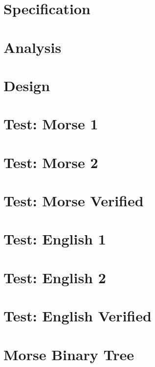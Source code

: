 \documentclass[twoside]{article}
\newcommand{\+}{\discretionary{\mbox{\scriptsize$\hookleftarrow$}}{}{}}
\begin{document}
\section{Specification}
\label{Specification}
\hypertarget{Specification}{}

\section{Analysis}
\label{Analysis}
\hypertarget{Analysis}{}

\section{Design}
\label{Design}
\hypertarget{Design}{}

\section{Test\+: Morse 1}
\label{Test_1_01Morse_011}
\hypertarget{Test_1_01Morse_011}{}

\section{Test\+: Morse 2}
\label{Test_1_01Morse_012}
\hypertarget{Test_1_01Morse_012}{}

\section{Test\+: Morse Verified}
\label{Test_1_01Morse_01Verified}
\hypertarget{Test_1_01Morse_01Verified}{}

\section{Test\+: English 1}
\label{Test_1_01English_011}
\hypertarget{Test_1_01English_011}{}

\section{Test\+: English 2}
\label{Test_1_01English_012}
\hypertarget{Test_1_01English_012}{}

\section{Test\+: English Verified}
\label{Test_1_01English_01Verified}
\hypertarget{Test_1_01English_01Verified}{}

\section{Morse Binary Tree}
\label{Morse_01Binary_01Tree}
\hypertarget{Morse_01Binary_01Tree}{}

\end{document}

